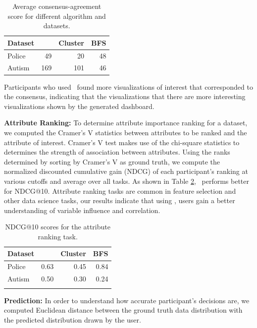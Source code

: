 \begin{table}
	\centering
	\begin{tabular}{lrrr}
	\hline
	 Dataset   &   \system &   Cluster &   BFS \\
	\hline
	 Police    &           49 &        20 &    48 \\
	 Autism    &          169 &       101 &    46 \\
	\hline
	\end{tabular}
	\caption{Average consensus-agreement score for different algorithm and datasets.}
	\label{interesting_score}
\end{table}

Participants who used \system\ found more visualizations of interest that corresponded to the consensus, indicating that the visualizations that there are more interesting visualizations shown by the generated dashboard.  
\par \textbf{Attribute Ranking:} 
To determine attribute importance ranking for a dataset, we computed the Cramer's V statistics between attributes to be ranked and the attribute of interest. Cramer's V test makes use of the chi-square statistics to determines the strength of association between attributes. Using the ranks determined by sorting by Cramer's V as ground truth, we compute the normalized discounted cumulative gain (NDCG) of each participant's ranking at various cutoffs and average over all tasks. As shown in Table \ref{ndcg_ranking_result}, \system\ performs better for NDCG@10. Attribute ranking tasks are common in feature selection and other data science tasks, our results indicate that using \system, users gain a better understanding of variable influence and correlation. 
\begin{table}
	\centering
	\begin{tabular}{lrrr}
	\hline
	 Dataset   &   \system &   Cluster &   BFS \\
	\hline
	 Police    &      0.63 &      0.45 &  0.84 \\
	 Autism    &      0.50 &      0.30 &  0.24 \\
	\hline
	\label{ndcg_ranking_result}
	\end{tabular}
	\caption{NDCG@10 scores for the attribute ranking task.}
\end{table}
\par \textbf{Prediction:}
In order to understand how accurate participant's decisions are, we computed Euclidean distance between the ground truth data distribution with the predicted distribution drawn by the user. 

